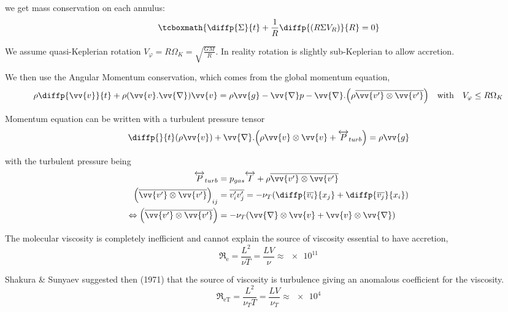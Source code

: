 \documentclass[10pt,a4paper,english,draft]{article}
\let\originalleft\left
\let\originalright\right
\renewcommand{\left}{\mathopen{}\mathclose\bgroup\originalleft}
\renewcommand{\right}{\aftergroup\egroup\originalright}
\begin{document}
we get mass conservation on each annulus:
\begin{equation}
    \tcboxmath{
        \diffp{\Sigma}{t} + \frac{1}{R} \diffp{(R \Sigma V_R)}{R} = 0
    }
\end{equation}

We assume quasi-Keplerian rotation $V_\varphi = R \Omega_K = \sqrt{\frac{G
M}{R}}$. In reality rotation is slightly sub-Keplerian to allow accretion.

We then use the Angular Momentum conservation, which comes from the global
momentum equation,
\begin{equation*}
    \rho \diffp{\vv{v}}{t} + \rho (\vv{v}.\vv{\nabla})\vv{v} = \rho \vv{g} - \vv{\nabla} p - \vv{\nabla}.\left(\rho \overline{\vv{v'} \otimes \vv{v'}}\right) \quad \text{with} \quad V_\varphi \leq R \Omega_K
\end{equation*}

Momentum equation can be written with a turbulent pressure tensor
\begin{equation*}
    \diffp{}{t}(\rho \vv{v}) + \vv{\nabla}.\left(\rho \vv{v} \otimes \vv{v} + \tens{P}_{turb}\right) = \rho \vv{g}
\end{equation*}


with the turbulent pressure being
\begin{align*}
    \tens{P}_{turb} &= p_{gas} \tens{I} + \rho \overline{\vv{v'} \otimes \vv{v'}} \\
    \left(\overline{\vv{v'} \otimes \vv{v'}}\right)_{ij} &= \overline{v_i' v_j'} = - \nu_T \left( \diffp{\overline{v_i}}{{x_j}} + \diffp{\overline{v_j}}{{x_i}} \right) \\
    \Leftrightarrow \left(\overline{\vv{v'} \otimes \vv{v'}}\right) &= - \nu_T \left(\vv{\nabla} \otimes \vv{v} + \vv{v} \otimes \vv{\nabla}\right)
\end{align*}


The molecular viscosity is completely inefficient and cannot explain the source
of viscosity essential to have accretion,
\begin{equation*}
    \mathfrak{R}_\mathrm{e} = \frac{L^2}{\nu T} = \frac{L V}{\nu} \approx \num{e11}
\end{equation*}

Shakura \& Sunyaev suggested then (1971) that the source of viscosity is
turbulence giving an anomalous coefficient for the viscosity.
\begin{equation*}
    \mathfrak{R}_\mathrm{eT} = \frac{L^2}{\nu_T T} = \frac{L V}{\nu_T} \approx \num{e4}
\end{equation*}
\end{document}
